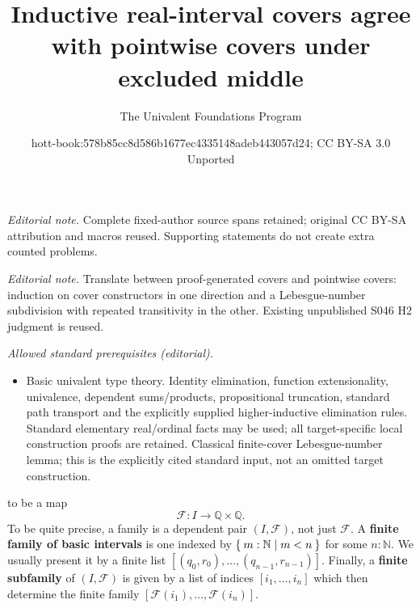 \documentclass[10pt,a4paper]{article}
\title{Inductive real-interval covers agree with pointwise covers under excluded middle}
\author{The Univalent Foundations Program}
\date{hott-book:578b85cc8d586b1677ec4335148adeb443057d24; CC BY-SA 3.0 Unported}
\newcounter{chapter}
\providecommand{\index}[1]{}
\newcommand{\define}[1]{\textbf{#1}}
\let\setof\Set    %
\newcommand{\N}{\ensuremath{\mathbb{N}}\xspace}
\newcommand{\Q}{\ensuremath{\mathbb{Q}}\xspace}
\theoremstyle{definition}
\theoremstyle{remark}
\numberwithin{equation}{section}
\newcommand{\indexdef}[1]{\index{#1|defstyle}}   %
\begin{document}
\maketitle
\setcounter{chapter}{11}
\setcounter{section}{0}
\setcounter{thm}{0}
\noindent\textit{Editorial note.} Complete fixed-author source spans retained; original CC BY-SA attribution and macros reused. Supporting statements do not create extra counted problems.\par\medskip
\noindent\textit{Editorial note.} Translate between proof-generated covers and pointwise covers: induction on cover constructors in one direction and a Lebesgue-number subdivision with repeated transitivity in the other. Existing unpublished S046 H2 judgment is reused.\par\medskip
\noindent\textit{Allowed standard prerequisites (editorial).}\begin{itemize}
\item Basic univalent type theory. Identity elimination, function extensionality, univalence, dependent sums/products, propositional truncation, standard path transport and the explicitly supplied higher-inductive elimination rules. Standard elementary real/ordinal facts may be used; all target-specific local construction proofs are retained. Classical finite-cover Lebesgue-number lemma; this is the explicitly cited standard input, not an omitted target construction.
\end{itemize}\medskip
\indexdef{family!of basic intervals}%
\indexdef{interval!family of basic}%
to be a map
%
\begin{equation*}
  \mathcal{F} : I \to \Q \times \Q.
\end{equation*}
%
To be quite precise, a family is a dependent pair $(I, \mathcal{F})$, not just
$\mathcal{F}$. A \define{finite family of basic intervals} is one indexed by $\setof{ m :
  \N | m < n}$ for some $n : \N$. We usually present it by a finite list $[(q_0, r_0), \ldots,
(q_{n-1}, r_{n-1})]$. Finally, a \define{finite subfamily}\indexdef{subfamily, finite, of intervals} of $(I, \mathcal{F})$ is given
by a list of indices $[i_1, \ldots, i_n]$ which then determine the finite family
$[\mathcal{F}(i_1), \ldots, \mathcal{F}(i_n)]$.
\end{document}
